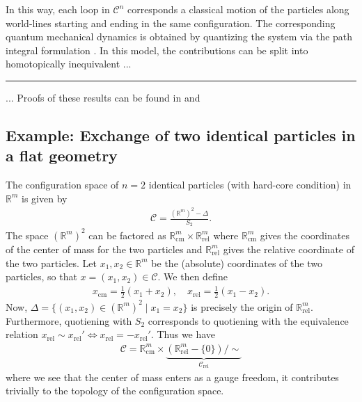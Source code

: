\documentclass[a4paper,10pt,oneside]{book}
\theoremstyle{plain}
\theoremstyle{definition}
\theoremstyle{remark}
\newcommand{\R}{\mathbb{R}}
\begin{document}
{In this way, each loop in $\mathcal{C}^n$ corresponds a classical motion of the particles along world-lines starting and ending in the same configuration. The corresponding quantum mechanical dynamics is obtained by quantizing the system via the path integral formulation \cite{feynmann path integral,nakahara}. In this model, the contributions can be split into homotopically inequivalent ... \cite{feynmann path integrals indistinguishable particles}

\hrule

... Proofs of these results can be found in \cite{oskar} and \cite{configuration spaces}


\subsection{Example: Exchange of two identical particles in a flat geometry}

The configuration space of $n = 2$ identical particles (with hard-core condition) in $\mathbb{R}^m$ is given by
\begin{align*}
  \mathcal{C} = \frac{(\R^m)^2 - \Delta}{S_2}.
\end{align*}
The space $(\R^m)^2$ can be factored as $\R^m_\text{cm} \times \R^m_\text{rel}$ where $\R^m_\text{cm}$ gives the coordinates of the center of mass for the two particles and $\R^m_\text{rel}$ gives the relative coordinate of the two particles. Let $x_1, x_2 \in \R^m$ be the (absolute) coordinates of the two particles, so that $x = (x_1, x_2) \in \mathcal{C}$. We then define
\begin{align*}
  x_\text{cm} = \frac{1}{2}(x_1 + x_2), \quad
  x_\text{rel} = \frac{1}{2}(x_1 - x_2).
\end{align*}
Now, $\Delta = \{(x_1, x_2) \in (\R^m)^2 \mid x_1 = x_2\}$ is precisely the origin of $\R^m_\text{rel}$.
Furthermore, quotiening with $S_2$ corresponds to quotiening with the equivalence relation $x_\text{rel} \sim x_\text{rel}' \iff x_\text{rel} = - x_\text{rel}'$. Thus we have
\begin{align*}
  \mathcal{C} = \R^m_\text{cm} \times \underbrace{(\R^m_\text{rel} - \{0\}) / \sim}_{\mathcal{C}_\text{rel}}
\end{align*}
where we see that the center of mass enters as a gauge freedom, it contributes trivially to the topology of the configuration space.

}
\end{document}
